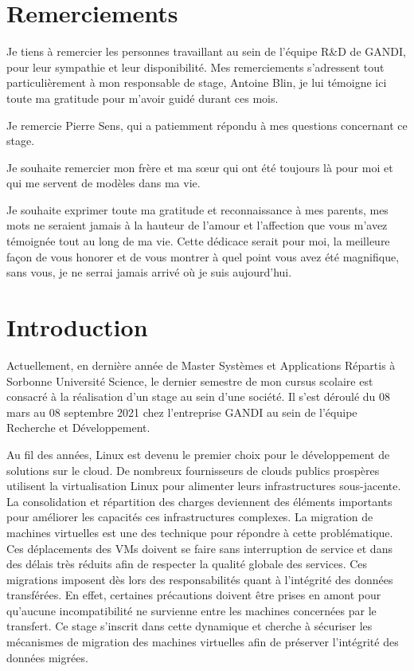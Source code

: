 \section*{Remerciements}

Je tiens à remercier les personnes travaillant au sein de l'équipe R\&D de GANDI, pour leur sympathie et leur disponibilité.
Mes remerciements s’adressent tout particulièrement à mon responsable de stage, Antoine Blin, je lui témoigne ici toute ma gratitude pour m'avoir guidé durant ces mois.


Je remercie Pierre Sens, qui a patiemment répondu à mes questions concernant ce stage.


Je souhaite remercier mon frère et ma sœur qui ont été toujours là pour moi et qui me servent de modèles dans ma vie.


Je souhaite exprimer toute ma gratitude et reconnaissance à mes parents, mes mots ne seraient jamais à la hauteur de l’amour et l’affection que vous m’avez témoignée tout au long de ma vie.
Cette dédicace serait pour moi, la meilleure façon de vous honorer et de vous montrer à quel point vous avez été magnifique, sans vous, je ne serrai jamais arrivé où je suis aujourd'hui. 

\newpage

\setcounter{page}{1}
\section*{Introduction}
Actuellement, en dernière année de Master Systèmes et Applications Répartis à Sorbonne Université Science, le dernier semestre de mon cursus scolaire est consacré à la réalisation d’un stage au sein d’une société.
Il s’est déroulé du 08 mars au 08 septembre 2021 chez l’entreprise GANDI au sein de l'équipe Recherche et Développement.



Au fil des années, Linux est devenu le premier choix pour le développement de solutions sur le cloud.
De nombreux fournisseurs de clouds publics prospères utilisent la virtualisation Linux pour alimenter leurs infrastructures sous-jacente.
La consolidation et répartition des charges deviennent des éléments importants pour améliorer les capacités ces infrastructures complexes.
La migration de machines virtuelles est une des technique pour répondre à cette problématique.
Ces déplacements des VMs doivent se faire sans interruption de service et dans des délais très réduits afin de respecter la qualité globale des services.
Ces migrations imposent dès lors des responsabilités quant à l'intégrité des données transférées.
En effet, certaines précautions doivent être prises en amont pour qu’aucune incompatibilité ne survienne entre les machines concernées par le transfert.
Ce stage s’inscrit dans cette dynamique et cherche à sécuriser les mécanismes de migration des machines virtuelles afin de préserver l'intégrité des données migrées.


